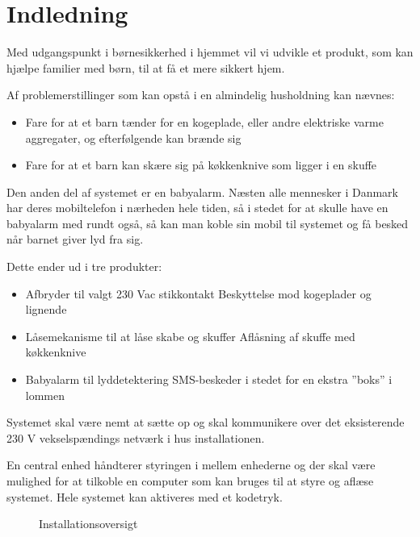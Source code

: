 \chapter{Indledning}

Med udgangspunkt i børnesikkerhed i hjemmet vil vi udvikle et produkt, som kan hjælpe familier med børn, til at få et mere sikkert hjem.

Af problemerstillinger som kan opstå i en almindelig husholdning kan nævnes:
\begin{itemize}
	\item Fare for at et barn tænder for en kogeplade, eller andre elektriske varme aggregater, og efterfølgende kan brænde sig
	\item Fare for at et barn kan skære sig på køkkenknive som ligger i en skuffe
\end{itemize}

Den anden del af systemet er en babyalarm. Næsten alle mennesker i Danmark har deres mobiltelefon i nærheden hele tiden, så i stedet for at skulle have en babyalarm med rundt også, så kan man koble sin mobil til systemet og få besked når barnet giver lyd fra sig.

Dette ender ud i tre produkter:

\begin{itemize}
\item Afbryder til valgt 230 Vac stikkontakt
\subitem Beskyttelse mod kogeplader og lignende
\item Låsemekanisme til at låse skabe og skuffer
\subitem Aflåsning af skuffe med køkkenknive
\item Babyalarm til lyddetektering
\subitem SMS-beskeder i stedet for en ekstra ''boks'' i lommen
\end{itemize}

Systemet skal være nemt at sætte op og skal kommunikere over det eksisterende 230 V vekselspændings netværk i hus installationen.

En central enhed håndterer styringen i mellem enhederne og der skal være mulighed for at tilkoble en computer som kan bruges til at styre og aflæse systemet. Hele systemet kan aktiveres med et kodetryk.

\newpage

\begin{figure}[h] \centering
{}
\caption{Installationsoversigt}
\label{fig:installationsoversigt}
\end{figure}

